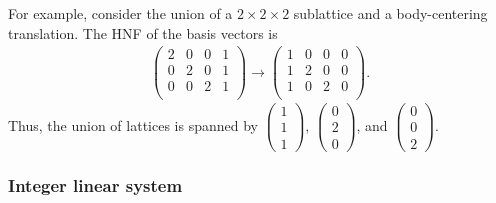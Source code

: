 For example, consider the union of a $2 \times 2 \times 2$ sublattice and a body-centering translation.
The HNF of the basis vectors is
\begin{align*}
  \begin{pmatrix}
    2 & 0 & 0 & 1 \\
    0 & 2 & 0 & 1 \\
    0 & 0 & 2 & 1 \\
  \end{pmatrix}
  \longrightarrow
  \begin{pmatrix}
    1 & 0 & 0 & 0 \\
    1 & 2 & 0 & 0 \\
    1 & 0 & 2 & 0 \\
  \end{pmatrix}.
\end{align*}
Thus, the union of lattices is spanned by $\begin{pmatrix} 1 \\ 1 \\ 1 \end{pmatrix}$, $\begin{pmatrix} 0 \\ 2 \\ 0 \end{pmatrix}$, and $\begin{pmatrix} 0 \\ 0 \\ 2 \end{pmatrix}$.

\subsubsection{\label{sec:integer-linear-system}Integer linear system}

